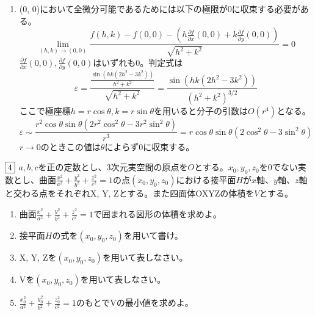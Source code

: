 \documentclass[dvipdfmx]{jsreport}
\renewcommand{\epsilon}{\varepsilon} %
\newcounter{num}[section]
\begin{document}
\begin{answer}
\begin{enumerate}
	\item (0, 0)において全微分可能であるためには以下の極限が0に収束する必要がある。
\begin{equation*}
	\lim_{(h, k)\to (0, 0)} \frac{f(h, k)- f(0, 0)- \left(h\frac{\partial f}{\partial x}(0, 0)+ k\frac{\partial f}{\partial y}(0, 0)\right)}{\sqrt{h^2+ k^2}}= 0
\end{equation*}
	$\frac{\partial f}{\partial x}(0, 0), \frac{\partial f}{\partial y}(0, 0)$はいずれも0。判定式は
\begin{equation*}
	\epsilon= \frac{\frac{\sin(hk(2h^2- 3k^2))}{h^2+ k^2}}{\sqrt{h^2+ k^2}}= \frac{\sin{(hk(2h^2- 3k^2))}}{(h^2+ k^2)^{3/2}}
\end{equation*}
	ここで極座標$h= r\cos{\theta}, k= r\sin{\theta}$を用いると分子の引数は$O(r^4)$となる。
\begin{equation*}
	\epsilon\sim \frac{r^2\cos{\theta}\sin{\theta}(2r^2\cos^2{\theta}- 3r^2\sin^2{\theta})}{r^3}= r\cos{\theta}\sin{\theta}(2\cos^2{\theta}- 3\sin^2{\theta})
\end{equation*}
	$r\to 0$のときこの値は$\theta$によらず0に収束する。
\end{enumerate}
\end{answer}


\begin{tcolorbox} %
	$\fbox{4}$ $a, b, c$を正の定数とし、3次元実空間の原点を$O$とする。$x_0, y_0, z_0$を0でない実数とし、曲面$\frac{x^2}{a^2}+ \frac{y^2}{b^2}+ \frac{z^2}{c^2}= 1$の点$(x_0, y_0, z_0)$における接平面$H$が$x$軸、$y$軸、$z$軸と交わる点をそれぞれX, Y, Zとする。また四面体OXYZの体積を$V$とする。
\begin{enumerate}
	\item 曲面$\frac{x^2}{a^2}+ \frac{y^2}{b^2}+ \frac{z^2}{c^2}= 1$で囲まれる図形の体積を求めよ。
	\item 接平面$H$の式を$(x_0, y_0, z_0)$を用いて書け。
	\item X, Y, Zを$(x_0, y_0, z_0)$を用いて表しなさい。
	\item Vを$(x_0, y_0, z_0)$を用いて表しなさい。
	\item $\frac{x_0^2}{a^2}+ \frac{y_0^2}{b^2}+ \frac{z_0^2}{c^2}= 1$のもとでVの最小値を求めよ。
\end{enumerate}
\end{tcolorbox}
\end{document}
